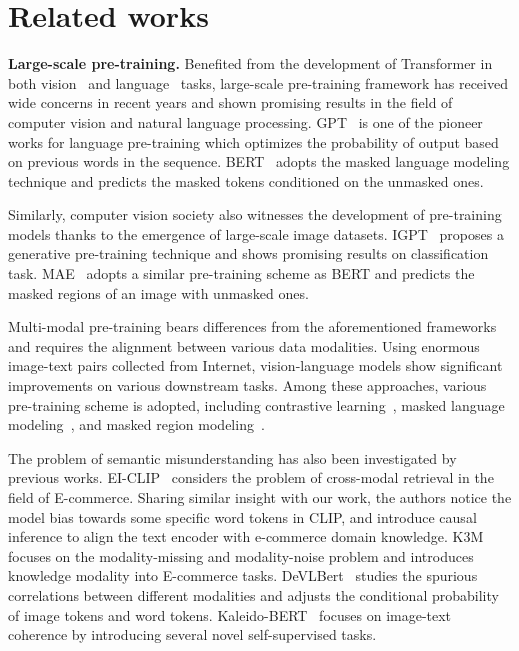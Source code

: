 \section{Related works}

\label{sec:related}

\textbf{Large-scale pre-training.} Benefited from the development of Transformer in both vision~\cite{acmix,dat,pointformer} and language~\cite{transformer} tasks, large-scale pre-training framework has received wide concerns in recent years and shown promising results in the field of computer vision and natural language processing. GPT~\cite{gpt} is one of the pioneer works for language pre-training which optimizes the probability of output based on previous words in the sequence. BERT~\cite{bert} adopts the masked language modeling technique and predicts the masked tokens conditioned on the unmasked ones. 

Similarly, computer vision society also witnesses the development of pre-training models thanks to the emergence of large-scale image datasets. IGPT~\cite{igpt} proposes a generative pre-training technique and shows promising results on classification task. MAE~\cite{mae} adopts a similar pre-training scheme as BERT and predicts the masked regions of an image with unmasked ones. 

Multi-modal pre-training bears differences from the aforementioned frameworks and requires the alignment between various data modalities. Using enormous image-text pairs collected from Internet, vision-language models show significant improvements on various downstream tasks. Among these approaches, various pre-training scheme is adopted, including contrastive learning~\cite{cont1,cont2,cont3}, masked language modeling~\cite{mlm1,mlm2}, and masked region modeling~\cite{uniter}. 

The problem of semantic misunderstanding has also been investigated by previous works. EI-CLIP~\cite{eiclip} considers the problem of cross-modal retrieval in the field of E-commerce. Sharing similar insight with our work, the authors notice the model bias towards some specific word tokens in CLIP, and introduce causal inference to align the text encoder with e-commerce domain knowledge. K3M~\cite{k3m} focuses on the modality-missing and modality-noise problem and introduces knowledge modality into E-commerce tasks. DeVLBert~\cite{devlbert} studies the spurious correlations between different modalities and adjusts the conditional probability of image tokens and word tokens. Kaleido-BERT~\cite{zhuge2021kaleido} focuses on image-text coherence by introducing several novel self-supervised tasks.


